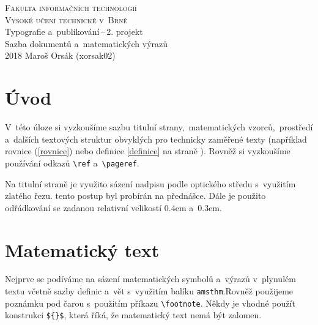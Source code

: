 \documentclass[11pt,a4paper,twocolumn]{article}
\theoremstyle{definition}
\theoremstyle{plain}
\begin{document}
\begin{titlepage}
\begin{center}
\textsc{\Huge Fakulta informačních technologií\\
Vysoké učení technické v~Brně}\\
\LARGE Typografie a~publikování\,--\,2. projekt\\
Sazba dokumentů a~matematických výrazů\\
\Large 2018 \hfill         Maroš Orsák (xorsak02) \newpage
\end{center}
\end{titlepage}



\section*{Úvod}

V~této úloze si vyzkoušíme sazbu titulní strany,~matematických vzorců,~prostředí a~dalších textových struktur obvyklých pro technicky zaměřené texty (například rovnice (\ref{rovnice}) nebo definice \ref{definice} na straně \pageref{definice}). Rovněž si vyzkoušíme používání odkazů \verb|\ref| a~\verb|\pageref|.

Na titulní straně je využito sázení nadpisu podle optického středu s~využitím zlatého řezu. tento postup byl probírán na přednášce. Dále je použito odřádkování se zadanou relativní velikostí 0.4em a~0.3em.

\section{Matematický text}

Nejprve se podíváme na sázení matematických symbolů a~výrazů v~plynulém textu včetně sazby definic a~vět s~využitím balíku \verb|amsthm|.Rovněž použijeme poznámku pod čarou s~použitím příkazu \verb|\footnote|. Někdy je vhodné použít konstrukci \verb|${}$|, která říká, že matematický text nemá být zalomen.
\end{document}
